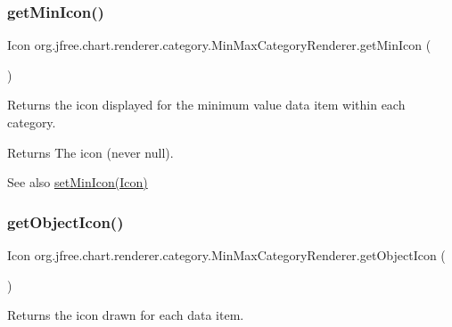 \subsubsection{\texorpdfstring{get\+Min\+Icon()}{getMinIcon()}}
{\footnotesize\ttfamily Icon org.\+jfree.\+chart.\+renderer.\+category.\+Min\+Max\+Category\+Renderer.\+get\+Min\+Icon (\begin{DoxyParamCaption}{ }\end{DoxyParamCaption})}

Returns the icon displayed for the minimum value data item within each category.

\begin{DoxyReturn}{Returns}
The icon (never {\ttfamily null}).
\end{DoxyReturn}
\begin{DoxySeeAlso}{See also}
\mbox{\hyperlink{classorg_1_1jfree_1_1chart_1_1renderer_1_1category_1_1_min_max_category_renderer_ab61a4df28c34c2298623f849a38ef9ee}{set\+Min\+Icon(\+Icon)}} 
\end{DoxySeeAlso}
\mbox{\label{classorg_1_1jfree_1_1chart_1_1renderer_1_1category_1_1_min_max_category_renderer_a0f7cfaff627bb78993c0f99d312cdd22}} 
\subsubsection{\texorpdfstring{get\+Object\+Icon()}{getObjectIcon()}}
{\footnotesize\ttfamily Icon org.\+jfree.\+chart.\+renderer.\+category.\+Min\+Max\+Category\+Renderer.\+get\+Object\+Icon (\begin{DoxyParamCaption}{ }\end{DoxyParamCaption})}

Returns the icon drawn for each data item.

